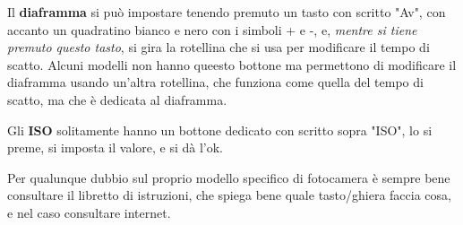 Il \textbf{diaframma} si può impostare tenendo premuto un tasto con scritto "Av", con accanto un quadratino bianco e nero con i simboli + e -, e, \textit{mentre si tiene premuto questo tasto}, si gira la rotellina che si usa per modificare il tempo di scatto.
Alcuni modelli non hanno queesto bottone ma permettono di modificare il diaframma usando un'altra rotellina, che funziona come quella del tempo di scatto, ma che è dedicata al diaframma.

Gli \textbf{ISO} solitamente hanno un bottone dedicato con scritto sopra "ISO", lo si preme, si imposta il valore, e si dà l'ok.

Per qualunque dubbio sul proprio modello specifico di fotocamera è sempre bene consultare il libretto di istruzioni, che spiega bene quale tasto/ghiera faccia cosa, e nel caso consultare internet.